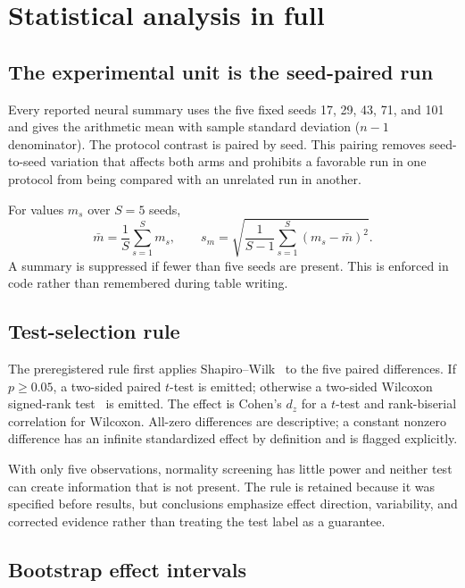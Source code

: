 \chapter{Statistical analysis in full}\label{s1:ch:ch12_statistical_analysis_in_full}

\section{The experimental unit is the seed-paired run}

Every reported neural summary uses the five fixed seeds 17, 29, 43, 71, and 101 and gives the arithmetic mean with sample standard deviation ($n-1$ denominator). The protocol contrast is paired by seed. This pairing removes seed-to-seed variation that affects both arms and prohibits a favorable run in one protocol from being compared with an unrelated run in another.

For values $m_s$ over $S=5$ seeds,
\begin{equation}
\bar m=\frac{1}{S}\sum_{s=1}^{S}m_s,\qquad
s_m=\sqrt{\frac{1}{S-1}\sum_{s=1}^{S}(m_s-\bar m)^2}.
\end{equation}
A summary is suppressed if fewer than five seeds are present. This is enforced in code rather than remembered during table writing.

\section{Test-selection rule}

The preregistered rule first applies Shapiro--Wilk~\cite{shapiro1965normality} to the five paired differences. If $p\geq0.05$, a two-sided paired $t$-test is emitted; otherwise a two-sided Wilcoxon signed-rank test~\cite{wilcoxon1945rank} is emitted. The effect is Cohen's $d_z$ for a $t$-test and rank-biserial correlation for Wilcoxon. All-zero differences are descriptive; a constant nonzero difference has an infinite standardized effect by definition and is flagged explicitly.

With only five observations, normality screening has little power and neither test can create information that is not present. The rule is retained because it was specified before results, but conclusions emphasize effect direction, variability, and corrected evidence rather than treating the test label as a guarantee.

\section{Bootstrap effect intervals}

